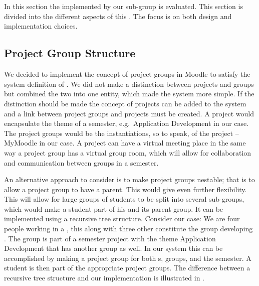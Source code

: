 \section{\administrationgroup{}}
\label{sec:productsubsystem}
In this section the \subsystem{} implemented by our sub-group is evaluated. 
This section is divided into the different aspects of this \subsystem{}.
The focus is on both design and implementation choices.

\subsection{Project Group Structure}
\label{sub:projectgroupstructure}
We decided to implement the concept of project groups in Moodle to satisfy the system definition of \system{}.
We did not make a distinction between projects and groups but combined the two into one entity, which made the system more simple. 
If the distinction should be made the concept of projects can be added to the system and a link between project groups and projects must be created.
A project would encapsulate the theme of a semester, e.g.\ Application Development in our case.
The project groups would be the instantiations, so to speak, of the project -- MyMoodle in our case.
A project can have a virtual meeting place in the same way a project group has a virtual group room, which will allow for collaboration and communication between groups in a semester. 

An alternative approach to consider is to make project groups nestable; that is to allow a project group to have a parent.
This would give even further flexibility.
This will allow for large groups of students to be split into several sub-groups, which would make a student part of his \subgroup{} and its parent group.
It can be implemented using a recursive tree structure.
Consider our case: We are four people working in a \subgroup{}, this \subgroup{} along with three other constitute the group developing \system{}.
The \system{} group is part of a semester project with the theme Application Development that has another group as well.
In our system this can be accomplished by making a project group for both \subgroup{}s, groups, and the semester.
A student is then part of the appropriate project groups.
The difference between a recursive tree structure and our implementation is illustrated in .

